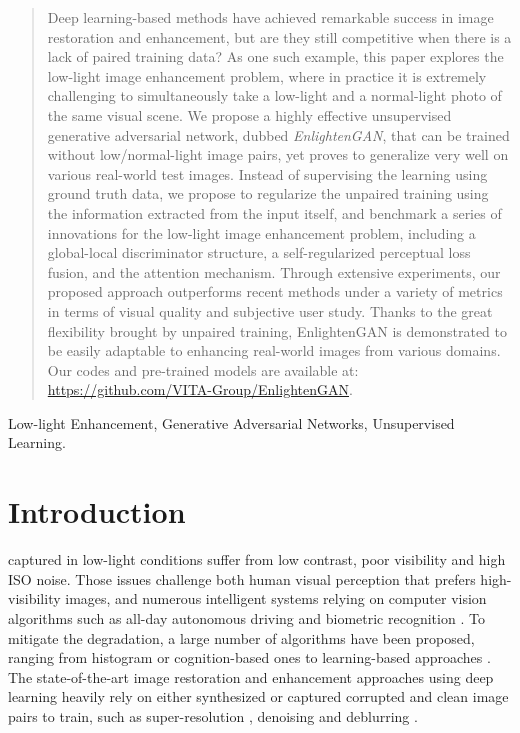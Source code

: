 \documentclass[journal]{IEEEtran}
\begin{document}
\begin{abstract}
Deep learning-based methods have achieved remarkable success in image restoration and enhancement, but are they still competitive when there is a lack of paired training data? As one such example, this paper explores the low-light image enhancement problem, where in practice it is extremely challenging to simultaneously take a low-light and a normal-light photo of the same visual scene. We propose a highly effective unsupervised generative adversarial network, dubbed \textit{EnlightenGAN}, that can be trained without low/normal-light image pairs, yet proves to generalize very well on various real-world test images. Instead of supervising the learning using ground truth data, we propose to regularize the unpaired training using the information extracted from the input itself, and benchmark a series of innovations for the low-light image enhancement problem, including a global-local discriminator structure, a self-regularized perceptual loss fusion, and the attention mechanism. Through extensive experiments, our proposed approach outperforms recent methods under a variety of metrics in terms of visual quality and subjective user study. Thanks to the great flexibility brought by unpaired training, EnlightenGAN is demonstrated to be easily adaptable to enhancing real-world images from various domains. Our codes and pre-trained models are available at: \url{https://github.com/VITA-Group/EnlightenGAN}.
\end{abstract}

\begin{IEEEkeywords}
Low-light Enhancement, Generative Adversarial Networks, Unsupervised Learning.
\end{IEEEkeywords}










\section{Introduction}



 captured in low-light conditions suffer from low contrast, poor visibility and high ISO noise. Those issues challenge both human visual perception that prefers high-visibility images, and numerous intelligent systems relying on computer vision algorithms such as all-day autonomous driving and biometric recognition \cite{yu2018bdd100k}. 
To mitigate the degradation, a large number of algorithms have been proposed, ranging from histogram or cognition-based ones \cite{land1977retinex,pizer1987adaptive} to learning-based approaches \cite{lore2017llnet,wei2018deep}. The state-of-the-art image restoration and enhancement approaches using deep learning heavily rely on either synthesized or captured corrupted and clean image pairs to train, such as super-resolution \cite{kim2016accurate}, denoising \cite{zhang2017beyond} and deblurring \cite{tao2018scale}. 
\end{document}
